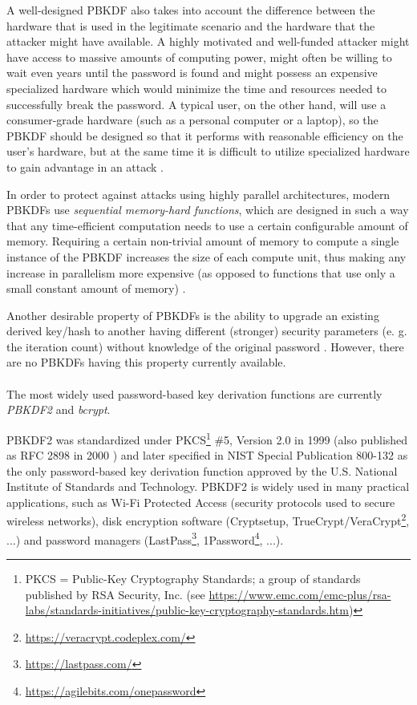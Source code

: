\documentclass[12pt,oneside]{fithesis2}
\begin{document}
      A well-designed PBKDF also takes into account the difference between the hardware that is used in the legitimate scenario and the hardware that the attacker might have available. A highly motivated and well-funded attacker might have access to massive amounts of computing power, might often be willing to wait even years until the password is found and might possess an expensive specialized hardware which would minimize the time and resources needed to successfully break the password. A typical user, on the other hand, will use a consumer-grade hardware (such as a personal computer or a laptop), so the PBKDF should be designed so that it performs with reasonable efficiency on the user's hardware, but at the same time it is difficult to utilize specialized hardware to gain advantage in an attack \cite{openwall:pwHashing}.
      
      In order to protect against attacks using highly parallel architectures, modern PBKDFs use \emph{sequential memory-hard functions}, which are designed in such a way that any time-efficient computation needs to use a certain configurable amount of memory. Requiring a certain non-trivial amount of memory to compute a single instance of the PBKDF increases the size of each compute unit, thus making any increase in parallelism more expensive (as opposed to functions that use only a small constant amount of memory) \cite{scrypt}.
      
      Another desirable property of PBKDFs is the ability to upgrade an existing derived key/hash to another having different (stronger) security parameters (e. g. the iteration count) without knowledge of the original password \cite{openwall:pwHashing}. However, there are no PBKDFs having this property currently available.
      
      \paragraph*{}
      The most widely used password-based key derivation functions are currently \emph{PBKDF2} and \emph{bcrypt}.
      
      PBKDF2 was standardized under PKCS\footnote{PKCS = Public-Key Cryptography Standards; a group of standards published by RSA Security, Inc. (see \url{https://www.emc.com/emc-plus/rsa-labs/standards-initiatives/public-key-cryptography-standards.htm})} \#5, Version 2.0 in 1999 (also published as RFC 2898 in 2000 \cite{rfc2898}) and later specified in NIST Special Publication 800-132 \cite{nist:sp800:132} as the only password-based key derivation function approved by the U.S. National Institute of Standards and Technology. PBKDF2 is widely used in many practical applications, such as Wi-Fi Protected Access (security protocols used to secure wireless networks), disk encryption software (Cryptsetup, TrueCrypt/VeraCrypt\footnote{\url{https://veracrypt.codeplex.com/}}, ...) and password managers (LastPass\footnote{\url{https://lastpass.com/}}, 1Password\footnote{\url{https://agilebits.com/onepassword}}, ...).
      
\end{document}
